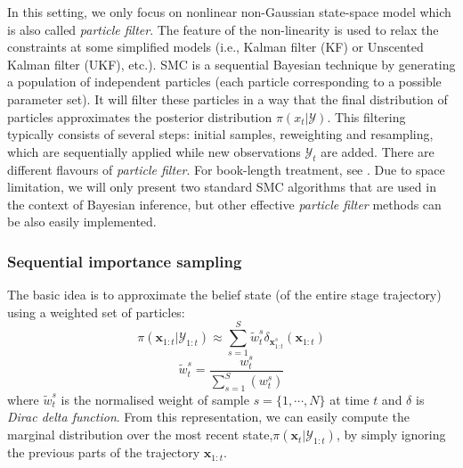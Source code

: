 In this setting, we only focus on nonlinear non-Gaussian state-space model which is also called \textit{particle filter}. The feature of the non-linearity is used to relax the constraints at some simplified models (i.e., Kalman filter (KF) or Unscented Kalman filter (UKF), etc.). \acrshort{SMC} is a sequential Bayesian technique by generating a population of independent particles (each particle corresponding to a possible parameter set). It will filter these particles in a way that the final distribution of particles approximates the posterior distribution $\pi({x}_{t}|\mathcal{Y})$. This filtering typically consists of several steps: initial samples, reweighting and resampling, which are sequentially applied while new observations $\mathcal{Y}_{t}$ are added. There are different flavours of \textit{particle filter}. For book-length treatment, see \cite{murphy2012}. Due to space limitation, we will only present two standard \acrshort{SMC} algorithms that are used in the context of Bayesian inference, but other effective \textit{particle filter} methods can be also easily implemented.


\subsubsection{Sequential importance sampling}
The basic idea is to approximate the belief state (of the entire stage trajectory) using a weighted set of particles:
\begin{equation}
    \label{eq: PF-SIS}
\pi(\boldsymbol{x}_{1:t}|\mathcal{Y}_{1:t})
\approx 
\sum_{s=1}^{S} 
\tilde{w}_{t}^{s}
\delta_{\boldsymbol{x}_{1:t}^{s}}(\boldsymbol{x}_{1:t})
\end{equation}
\begin{equation}
    \label{eq: PF-SIS-Normalized_weight}
\tilde{w}_t^s=\frac{w_t^s}{\sum_{s=1}^{S}{(w_t^s)}}
\end{equation}
where $\tilde{w}_{t}^{s}$ is the normalised weight of sample $s = \{1,\cdots,N\}$ at time $t$ and  $\delta$ is \textit{Dirac delta function}. From this representation, we can easily compute the marginal distribution over the most recent state,$\pi(\boldsymbol{x}_{t}|\mathcal{Y}_{1:t})$, by simply ignoring the previous parts of the trajectory $\boldsymbol{x}_{1:t}$.

